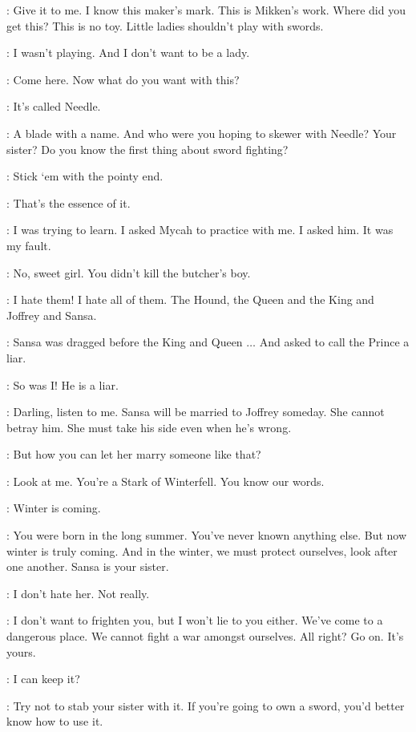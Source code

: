 \NED: Give it to me. I know this maker's mark. This is Mikken's work. Where did you get this? This is no toy. Little ladies shouldn't play with swords. 

\ARYA: I wasn't playing. And I don't want to be a lady. 

\NED: Come here. Now what do you want with this? 

\ARYA: It's called Needle. 

\NED: A blade with a name. And who were you hoping to skewer with Needle? Your sister? Do you know the first thing about sword fighting? 

\ARYA: Stick `em with the pointy end. 

\NED: That's the essence of it. 

\ARYA: I was trying to learn. I asked Mycah to practice with me. I asked him. It was my fault. 

\NED: No, sweet girl. You didn't kill the butcher's boy. 

\ARYA: I hate them! I hate all of them. The Hound, the Queen and the King and Joffrey and Sansa. 

\NED: Sansa was dragged before the King and Queen $\ldots$ And asked to call the Prince a liar. 

\ARYA: So was I! He is a liar. 

\NED: Darling, listen to me. Sansa will be married to Joffrey someday. She cannot betray him. She must take his side even when he's wrong. 

\ARYA: But how you can let her marry someone like that? 

\NED: Look at me. You're a Stark of Winterfell. You know our words. 

\ARYA: Winter is coming. 

\NED: You were born in the long summer. You've never known anything else. But now winter is truly coming. And in the winter, we must protect ourselves, look after one another. Sansa is your sister. 

\ARYA: I don't hate her. Not really. 

\NED: I don't want to frighten you, but I won't lie to you either. We've come to a dangerous place. We cannot fight a war amongst ourselves. All right?  Go on. It's yours. 

\ARYA: I can keep it? 

\NED: Try not to stab your sister with it. If you're going to own a sword, you'd better know how to use it. 

